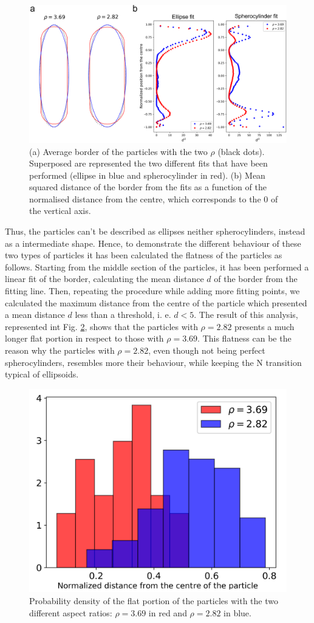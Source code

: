 \documentclass[aip,graphicx]{revtex4-1}
\begin{document}
\begin{figure}
    \centering
    \includegraphics[width=0.7\columnwidth]{Mean_bord.png}
    \caption{(a) Average border of the particles with the two $\rho$ (black dots). Superposed are represented the two different fits that have been performed (ellipse in blue and spherocylinder in red). (b) Mean squared distance of the border from the fits as a function of the normalised distance from the centre, which corresponds to the $0$ of the vertical axis.}
    \label{fig:Mean_bord}
\end{figure}

Thus, the particles can't be described as ellipses neither spherocylinders, instead as a intermediate shape. Hence, to demonstrate the different behaviour of these two types of particles it has been calculated the flatness of the particles as follows. Starting from the middle section of the particles, it has been performed a linear fit of the border, calculating the mean distance $d$ of the border from the fitting line. Then, repeating the procedure while adding more fitting points, we calculated the maximum distance from the centre of the particle which presented a mean distance $d$ less than a threshold, i. e. $d < 5$. The result of this analysis, represented int Fig. \ref{fig:maxlength_div}, shows that the particles with $\rho=2.82$ presents a much longer flat portion in respect to those with $\rho=3.69$. This flatness can be the reason why the particles with $\rho=2.82$, even though not being perfect spherocylinders, resembles more their behaviour, while keeping the N transition typical of ellipsoids. 

\begin{figure}
    \centering
    \includegraphics[width=0.5\columnwidth]{maxlength_div.png}
    \caption{Probability density of the flat portion of the particles with the two different aspect ratios: $\rho=3.69$ in red and $\rho=2.82$ in blue.}
    \label{fig:maxlength_div}
\end{figure}


\end{document}
